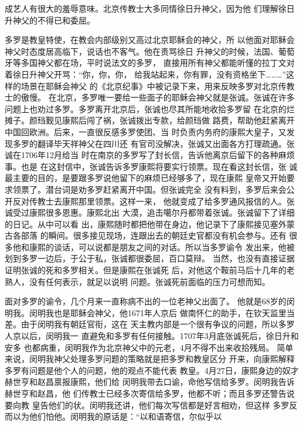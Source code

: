 成艺人有很大的羞辱意味。北京传教士大多同情徐日升神父，因为他%
们理解徐日升神父的不得已和委屈。%
\par
多罗是教皇特使，在教会内部级别又高过北京耶稣会的神父，所%
以他面对耶稣会神父时态度居高临下，说话也不客气。他在责骂徐日%
升神父的时候，法国、葡萄牙等多国神父都在场，平时说法文的多罗，%
直接用所有神父都能听懂的拉丁文对着徐日升神父开骂：“你，你，你，%
给我站起来，你有罪，没有资格坐下………”这样的场景在耶稣会神父%
的《北京纪事》中被记录下来，用来反映多罗对北京传教士的傲慢。%
在北京，多罗唯一要给一些面子的耶稣会神父就是张诚。张诚在许多%
问题上也劝过多罗。多罗离开北京后，张诚也尽其所能地收拾多罗留%
在北京的烂摊子。颜珰觐见康熙后闯了祸，张诚拨出专款，给颜珰做%
路费，帮助他赶紧离开中国回欧洲。后来，一直很反感多罗使团、当%
时负责内务府的康熙大皇子，又发现多罗的翻译毕天祥神父在四川还%
有官司没解决，张诚又出面各方打理疏通。张诚在1706年12月给当%
时在南京的多罗写了封长信，告诉他离京后留下的各种麻烦事。也是%
在这封信中，张诚告诉多罗康熙将要实行领票。现在看这封长信，张%
诚最主要的目的，是要跟多罗说他留下的麻烦已经够多了，现在康熙%
皇帝又开始要求领票了。潜台词是劝多罗赶紧离开中国。但张诚完全%
没有料到，多罗后来会公开反对传教士去康熙那里领票。这样一来，%
他就变成了给多罗通风报信的人。张诚受过康熙很多恩惠。康熙北出%
大漠，追击噶尔丹都带着张诚。张诚留下了详细的日记。从中可以看%
出，康熙随时都把他带在身边，他记录下了康熙接见塞外蒙古各部落%
的瞬间。很多接见现场，连跟出去的朝廷史官都没有机会参与。还有%
很多他和康熙的谈话，可以说都是朋友之间的对话。所以当多罗谕令%
发出来，他被划到多罗一边后，于公于私，张诚都很委屈，百口莫辩。%
当然，也没有直接证据证明张诚的死和多罗相关。但是康熙在张诚死%
后，对他这个鞍前马后十几年的老熟人，没有任何表示，就足以说明%
问题。张诚死前面临的压力可想而知。%
\par
面对多罗的谕令，几个月来一直称病不出的一位老神父出面了。%
他就是68岁的闵明我。闵明我也是耶稣会神父，他1671年人京后%
做南怀仁的助手，在钦天监里当差。由于闵明我有朝廷官衔，这在%
天主教内部是一个很有争议的问题，所以多罗人京以后，闵明我一%
直避免和多罗有任何接触。1707年3月底张诚死后，徐日升和安多%
也都病重，闵明我作为北京神父中的元老，4月不得不出来收拾残局。%
简单来说，闵明我神父处理多罗问题的策略就是把多罗和教皇区分%
开来，向康熙解释多罗有问题是他个人的问题，他的观点不能代表%
教皇。4月27日，康熙身边的奴才赫世亨和赵昌禀报康熙，他们给%
闵明我带去口谕，命他写信给多罗。闵明我告诉赫世亨和赵昌，他%
们传教士已经多次寄信给多罗，他都不听；而且多罗还警告说要向教%
皇告他们的状。闵明我还讲，他们每次写信都是好言相劝，但这样%
多罗反而以为他们怕他。闵明我的原话是：“以和语寄信，尔似乎以%
